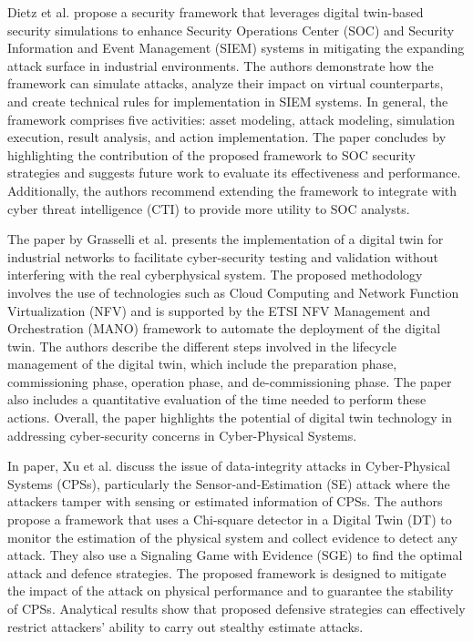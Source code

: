 Dietz et al.\cite{dietzIntegratingDigitalTwin2020} propose a security framework that leverages digital twin-based security simulations to enhance Security Operations Center (SOC) and Security Information and Event Management (SIEM) systems in mitigating the expanding attack surface in industrial environments. The authors demonstrate how the framework can simulate attacks, analyze their impact on virtual counterparts, and create technical rules for implementation in SIEM systems. In general, the framework comprises five activities: asset modeling, attack modeling, simulation execution, result analysis, and action implementation. The paper concludes by highlighting the contribution of the proposed framework  to SOC security strategies and suggests future work to evaluate its effectiveness and performance. Additionally, the authors recommend extending the framework to integrate with cyber threat intelligence (CTI) to provide more utility to SOC analysts.

The paper by Grasselli et al.\cite{grasselliIndustrialNetworkDigital2022} presents the implementation of a digital twin for industrial networks to facilitate cyber-security testing and validation without interfering with the real cyberphysical system. The proposed methodology involves the use of technologies such as Cloud Computing and Network Function Virtualization (NFV) and is supported by the ETSI NFV Management and Orchestration (MANO) framework to automate the deployment of the digital twin. The authors describe the different steps involved in the lifecycle management of the digital twin, which include the preparation phase, commissioning phase, operation phase, and de-commissioning phase. The paper also includes a quantitative evaluation of the time needed to perform these actions. Overall, the paper highlights the potential of digital twin technology in addressing cyber-security concerns in Cyber-Physical Systems.


In\cite{xuGametheoreticApproachSecure2020} paper, Xu et al. discuss the issue of data-integrity attacks in Cyber-Physical Systems (CPSs), particularly the Sensor-and-Estimation (SE) attack where the attackers tamper with sensing or estimated information of CPSs. The authors propose a framework that uses a Chi-square detector in a Digital Twin (DT) to monitor the estimation of the physical system and collect evidence to detect any attack. They also use a Signaling Game with Evidence (SGE) to find the optimal attack and defence strategies. The proposed framework is designed to mitigate the impact of the attack on physical performance and to guarantee the stability of CPSs. Analytical results show that proposed defensive strategies can effectively restrict attackers' ability to carry out stealthy estimate attacks.


